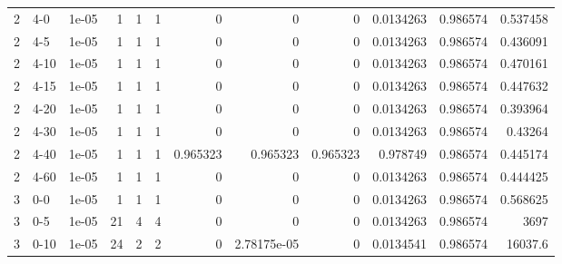 \begin{tabular}{rlrrrrrrrrrr}
     2 & 4-0    &      1e-05 &           1 &                 1 &                 1 &     0           &     0           &      0           &        0.0134263 &               0.986574 &           0.537458 \\
     2 & 4-5    &      1e-05 &           1 &                 1 &                 1 &     0           &     0           &      0           &        0.0134263 &               0.986574 &           0.436091 \\
     2 & 4-10   &      1e-05 &           1 &                 1 &                 1 &     0           &     0           &      0           &        0.0134263 &               0.986574 &           0.470161 \\
     2 & 4-15   &      1e-05 &           1 &                 1 &                 1 &     0           &     0           &      0           &        0.0134263 &               0.986574 &           0.447632 \\
     2 & 4-20   &      1e-05 &           1 &                 1 &                 1 &     0           &     0           &      0           &        0.0134263 &               0.986574 &           0.393964 \\
     2 & 4-30   &      1e-05 &           1 &                 1 &                 1 &     0           &     0           &      0           &        0.0134263 &               0.986574 &           0.43264  \\
     2 & 4-40   &      1e-05 &           1 &                 1 &                 1 &     0.965323    &     0.965323    &      0.965323    &        0.978749  &               0.986574 &           0.445174 \\
     2 & 4-60   &      1e-05 &           1 &                 1 &                 1 &     0           &     0           &      0           &        0.0134263 &               0.986574 &           0.444425 \\
     3 & 0-0    &      1e-05 &           1 &                 1 &                 1 &     0           &     0           &      0           &        0.0134263 &               0.986574 &           0.568625 \\
     3 & 0-5    &      1e-05 &          21 &                 4 &                 4 &     0           &     0           &      0           &        0.0134263 &               0.986574 &        3697        \\
     3 & 0-10   &      1e-05 &          24 &                 2 &                 2 &     0           &     2.78175e-05 &      0           &        0.0134541 &               0.986574 &       16037.6      \\

\end{tabular}
